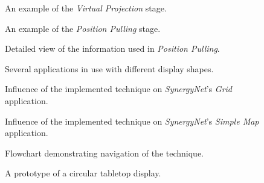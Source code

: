 \documentclass{bmcart}
\begin{document}
\begin{backmatter}
\begin{figure}[h!]
 \centering
   \caption{
   An example of the {\emph{Virtual Projection}} stage.}
   \label{fig:virtualRectangle}
\end{figure}

\begin{figure}[h!] 
 \centering
   \caption{
   An example of the {\emph{Position Pulling}} stage.}
   \label{fig:pullLayout}
\end{figure}

\begin{figure}[h!]
 \centering
   \caption{
   Detailed view of the information used in {\emph{Position Pulling}}.}
   \label{fig:pullLayoutExp}
\end{figure}

\begin{figure}[h!] 
 \centering
  \caption{
  Several applications in use with different display shapes.}
  \label{fig:study}
\end{figure}

\begin{figure}[h!] 
 \centering
  \caption{
  Influence of the implemented technique on {\emph{SynergyNet}}'s {\emph{Grid}} application.}
  \label{fig:gridApp}
\end{figure}

\begin{figure}[h!] 
 \centering
  \caption{
  Influence of the implemented technique on {\emph{SynergyNet}}'s {\emph{Simple Map}} application.}
  \label{fig:mapApp}
\end{figure}

\begin{figure}[h!] 
 \centering
   \caption{
   Flowchart demonstrating navigation of the technique.}
   \label{fig:flowchart}
\end{figure}

\begin{figure}[h!]
 \centering
   \caption{
   A prototype of a circular tabletop display.}
   \label{fig:prototypeTabletop}
\end{figure}


\end{backmatter}
\end{document}
